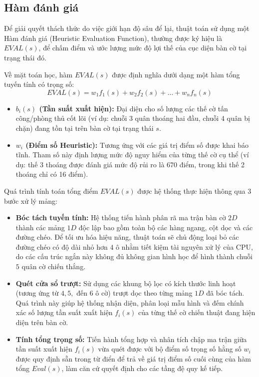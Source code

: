 \subsection{Hàm đánh giá}

Để giải quyết thách thức do việc giới hạn độ sâu để lại, thuật toán sử dụng một Hàm đánh giá (Heuristic Evaluation Function), thường được ký hiệu là $EVAL(s)$, để chấm điểm và ước lượng mức độ lợi thế của cục diện bàn cờ tại trạng thái đó.

Về mặt toán học, hàm $EVAL(s)$ được định nghĩa dưới dạng một hàm tổng tuyến tính có trọng số:
\begin{equation}
	EVAL(s) = w_1 f_1(s) + w_2 f_2(s) + \dots + w_n f_n(s)
\end{equation}

\begin{itemize}
	\item \textbf{$b_i(s)$ (Tần suất xuất hiện):} Đại diện cho số lượng các thế cờ tấn công/phòng thủ cốt lõi (ví dụ: chuỗi 3 quân thoáng hai đầu, chuỗi 4 quân bị chặn) đang tồn tại trên bàn cờ tại trạng thái $s$.
	
	\item \textbf{$w_i$ (Điểm số Heuristic):} Tương ứng với các giá trị điểm số được khai báo tĩnh. Tham số này định lượng mức độ nguy hiểm của từng thế cờ cụ thể (ví dụ: thế 3 thoáng được đánh giá mức độ rủi ro là 670 điểm, trong khi thế 2 thoáng chỉ có 16 điểm).
\end{itemize}

Quá trình tính toán tổng điểm $EVAL(s)$ được hệ thống thực hiện thông qua 3 bước xử lý mảng:
\begin{itemize}
	\item \textbf{Bóc tách tuyến tính:} Hệ thống tiến hành phân rã ma trận bàn cờ $2D$ thành các mảng $1D$ độc lập bao gồm toàn bộ các hàng ngang, cột dọc và các đường chéo. Để tối ưu hóa hiệu năng, thuật toán sẽ chủ động loại bỏ các đường chéo có độ dài nhỏ hơn $4$ ô nhằm tiết kiệm tài nguyên xử lý của CPU, do các cấu trúc ngắn này không đủ không gian hình học để hình thành chuỗi $5$ quân cờ chiến thắng.
	\item \textbf{Quét cửa sổ trượt:} Sử dụng các khung bộ lọc có kích thước linh hoạt (tương ứng từ $4, 5,$ đến $6$ ô cờ) trượt dọc theo từng mảng $1D$ đã bóc tách. Quá trình này giúp hệ thống nhận diện, phân loại mẫu hình và đếm chính xác số lượng tần suất xuất hiện $f_i(s)$ của từng thế cờ chiến thuật đang hiện diện trên bàn cờ.
	\item \textbf{Tính tổng trọng số:} Tiến hành tổng hợp và nhân tích chập ma trận giữa tần suất xuất hiện $f_i(s)$ vừa quét được với bộ điểm số trọng số hằng số $w_i$ được quy định sẵn trong từ điển để trả về giá trị điểm số cuối cùng của hàm tổng $Eval(s)$, làm căn cứ quyết định cho các tầng đệ quy kế tiếp.
\end{itemize}


